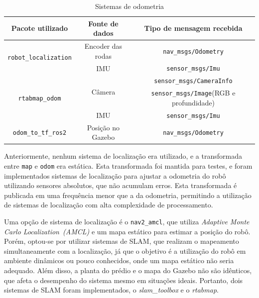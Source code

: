 \documentclass[repeatfields,xlists,xpacks,oneside,yearsonly]{ufrgscca}
\begin{document}

\begin{table}[h]
    \begin{center}
    \caption{Sistemas de odometria}
    \label{tab:odometria}
    \begin{tabular}{c|c|c}
    Pacote utilizado & Fonte de dados & Tipo de mensagem recebida \\
    \hline
    \multirow{2}{*}{\texttt{robot\_localization}} & Encoder das rodas & \texttt{nav\_msgs/Odometry}\\ 
                                                  & IMU	              & \texttt{sensor\_msgs/Imu}\\
    \hline
    \multirow{3}{*}{\texttt{rtabmap\_odom}} & \multirow{2}{*}{Câmera} & \texttt{sensor\_msgs/CameraInfo} \\
                                            &                               & \texttt{sensor\_msgs/Image}(RGB e profundidade) \\ 
                                            & IMU  & \texttt{sensor\_msgs/Imu}	\\
    \hline
    \texttt{odom\_to\_tf\_ros2} & Posição no Gazebo	& \texttt{nav\_msgs/Odometry} \\
    \end{tabular}
\end{center}
\end{table}

Anteriormente, nenhum sistema de localização era utilizado, e a transformada 
entre \texttt{map} e \texttt{odom} era estática.
Esta transformada foi mantida para testes, e foram implementados sistemas
de localização para ajustar a odometria do robô utilizando sensores absolutos,
que não acumulam erros.
Esta transformada é publicada em uma frequência menor que a da odometria,
permitindo a utilização de sistemas de localização com alta complexidade de 
processamento.


Uma opção de sistema de localização é o \texttt{nav2\_amcl}, que utiliza
\textit{Adaptive Monte Carlo Localization~(AMCL)} e um mapa estático para 
estimar a posição do robô.
Porém, optou-se por utilizar sistemas de SLAM, que realizam
o mapeamento simultaneamente com a localização, já que 
o objetivo é a utilização do robô em ambiente dinâmicos ou pouco conhecidos,
onde um mapa estático não seria adequado. 
Além disso, a planta do prédio e o mapa do Gazebo não são idênticos, que 
afeta o desempenho do sistema mesmo em situações ideais.
Portanto, dois sistemas de SLAM foram implementados, 
o \textit{slam\_toolbox} e o \textit{rtabmap}.
\end{document}
